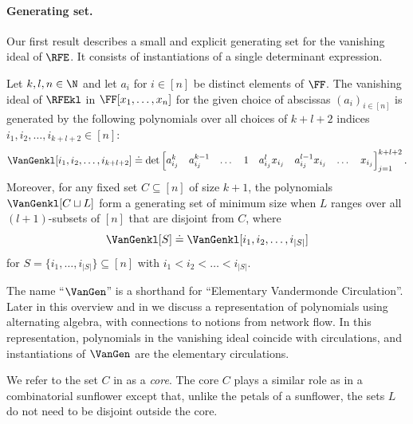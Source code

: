 \paragraph{Generating set.}
Our first result describes a small and explicit generating set for the
vanishing ideal of $\RFE$.
It consists of instantiations of a single determinant expression.
\begin{theorem}\label{thm.ideal.generators}
  Let $k, l, n \in \N$ and let $a_i$ for $i \in [n]$ be distinct elements of $\FF$.
  The vanishing ideal of $\RFEkl$ in $\FF[x_1,\dots,x_n]$ for the
  given choice of abscissas $(a_i)_{i\in[n]}$ is generated by the following
  polynomials over all choices of $k+l+2$ indices
  $i_1, i_2, \dots, i_{k+l+2} \in [n]$:
  \begin{equation}\label{eq.def.gen}
    \VanGenkl[i_1,i_2, \dots, i_{k+l+2}]
    \doteq \det
      \begin{bmatrix}
        a_{i_j}^{k} & a_{i_j}^{k-1} & \dots & 1 &
        a_{i_j}^l x_{i_j} & a_{i_j}^{l-1}x_{i_j} & \dots & x_{i_j}
      \end{bmatrix}_{j=1}^{k+l+2}.
  \end{equation}
  Moreover,
  for any fixed set $C \subseteq [n]$ of size $k+1$, the polynomials $\VanGenkl[C \sqcup L]$
  form a generating set of minimum size when $L$ ranges over all $(l+1)$-subsets of $[n]$ that are disjoint from $C$, where 
  \[\VanGenkl[S] \doteq \VanGenkl[i_1,i_2,\dots,i_{|S|}]\] 
  for $S = \{i_1, \dots, i_{|S|}\} \subseteq [n]$ with $i_1 < i_2 < \dots < i_{|S|}$.
 \end{theorem}
The name ``\(\VanGen\)'' is a shorthand for ``Elementary Vandermonde
Circulation''.
Later in this overview and in  we discuss a representation of polynomials using alternating algebra,
with connections to notions from network flow.
In this representation, polynomials in the vanishing ideal coincide with
circulations,
and instantiations of \(\VanGen\) are the elementary circulations.

We refer to the set $C$ in  as a
\emph{core}.
The core $C$ plays a similar role as in a combinatorial sunflower except that,
unlike the petals of a sunflower,
the sets $L$ do not need to be disjoint outside the
core.


